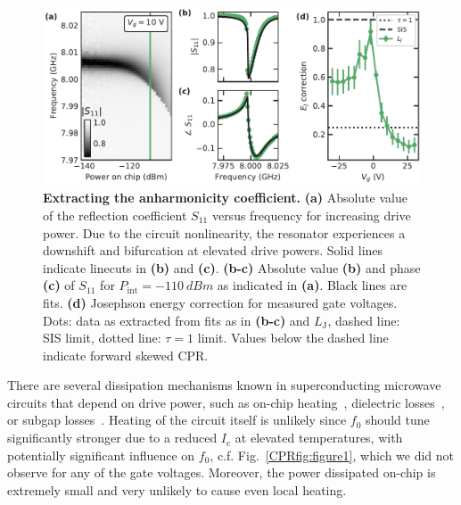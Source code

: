 \begin{figure}[t]
	\centering
	\includegraphics[width=\linewidth]{chapter-gJJ-CPR/figs/Figure3}
	\caption{
		\textbf{Extracting the anharmonicity coefficient.}
		\textbf{(a)} Absolute value of the reflection coefficient $S_{11}$ versus frequency for increasing drive power.
		Due to the circuit nonlinearity, the resonator experiences a downshift and bifurcation at elevated drive powers.
		Solid lines indicate linecuts in \textbf{(b)} and \textbf{(c)}.
		\textbf{(b-c)} Absolute value \textbf{(b)} and phase \textbf{(c)} of $S_{11}$ for $P_\text{int}=\SI{-110}{dBm}$ as indicated in \textbf{(a)}.
		Black lines are fits.
		\textbf{(d)} Josephson energy correction for measured gate voltages.
		Dots: data as extracted from fits as in \textbf{(b-c)} and $L_\text{J}$, dashed line: SIS limit, dotted line: $\tau=1$ limit.
		Values below the dashed line indicate forward skewed CPR.
	}
	\label{CPRfig:figure3}
\end{figure}

There are several dissipation mechanisms known in superconducting microwave circuits that depend on drive power, such as on-chip heating~\cite{portisPowerinducedSwitchingHTS1991,heinFundamentalLimitsLinear1997,wosikPowerHandlingCapabilities1997}, dielectric losses~\cite{martinisDecoherenceJosephsonQubits2005c,oconnellMicrowaveDielectricLoss2008a,gunnarssonDielectricLossesMultilayer2013,lisenfeldElectricFieldSpectroscopy2019}, or subgap losses~\cite{dassonnevilleDissipationSupercurrentFluctuations2013,ferrierPhasedependentAndreevSpectrum2013,dassonnevilleCoherenceenhancedPhasedependentDissipation2018}.
%
Heating of the circuit itself is unlikely since $f_0$ should tune significantly stronger due to a reduced $I_\text{c}$ at elevated temperatures, with potentially significant influence on $f_0$, c.f. Fig.~\ref{CPRfig:figure1}, which we did not observe for any of the gate voltages.
%
Moreover, the power dissipated on-chip is extremely small and very unlikely to cause even local heating.

